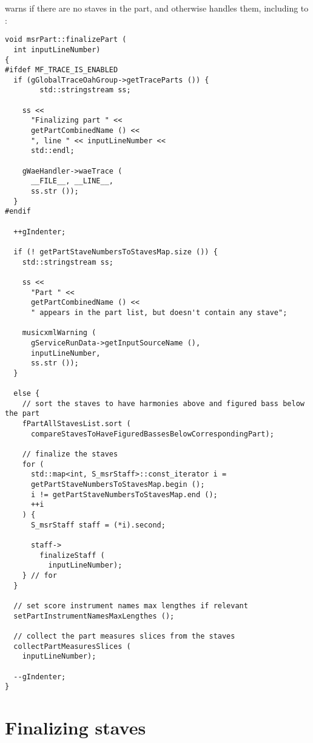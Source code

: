  warns if there are no staves in the part, and otherwise handles them, including \cascading to :
\begin{lstlisting}[language=CPlusPlus]
void msrPart::finalizePart (
  int inputLineNumber)
{
#ifdef MF_TRACE_IS_ENABLED
  if (gGlobalTraceOahGroup->getTraceParts ()) {
		std::stringstream ss;

    ss <<
      "Finalizing part " <<
      getPartCombinedName () <<
      ", line " << inputLineNumber <<
      std::endl;

    gWaeHandler->waeTrace (
      __FILE__, __LINE__,
      ss.str ());
  }
#endif

  ++gIndenter;

  if (! getPartStaveNumbersToStavesMap.size ()) {
    std::stringstream ss;

    ss <<
      "Part " <<
      getPartCombinedName () <<
      " appears in the part list, but doesn't contain any stave";

    musicxmlWarning (
      gServiceRunData->getInputSourceName (),
      inputLineNumber,
      ss.str ());
  }

  else {
    // sort the staves to have harmonies above and figured bass below the part
    fPartAllStavesList.sort (
      compareStavesToHaveFiguredBassesBelowCorrespondingPart);

    // finalize the staves
    for (
      std::map<int, S_msrStaff>::const_iterator i =
      getPartStaveNumbersToStavesMap.begin ();
      i != getPartStaveNumbersToStavesMap.end ();
      ++i
    ) {
      S_msrStaff staff = (*i).second;

      staff->
        finalizeStaff (
          inputLineNumber);
    } // for
  }

  // set score instrument names max lengthes if relevant
  setPartInstrumentNamesMaxLengthes ();

  // collect the part measures slices from the staves
  collectPartMeasuresSlices (
    inputLineNumber);

  --gIndenter;
}
\end{lstlisting}



\section{Finalizing staves}

